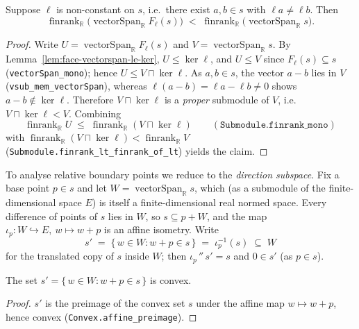 \begin{lemma}
    \label{lem:exposed-face-lower-dim}
    \leanok
    Suppose $\ell$ is non-constant on $s$, i.e.\ there exist $a, b \in s$ with
    $\ell a \ne \ell b$. Then
    \[
        \operatorname{finrank}_{\mathbb R}\big(\operatorname{vectorSpan}_{\mathbb R} F_\ell(s)\big)
        \;<\;
        \operatorname{finrank}_{\mathbb R}\big(\operatorname{vectorSpan}_{\mathbb R} s\big).
    \]
\end{lemma}
\begin{proof}
    Write $U = \operatorname{vectorSpan}_{\mathbb R} F_\ell(s)$ and
    $V = \operatorname{vectorSpan}_{\mathbb R} s$. By
    Lemma~\ref{lem:face-vectorspan-le-ker}, $U \le \ker \ell$, and $U \le V$ since
    $F_\ell(s) \subseteq s$ (\texttt{vectorSpan\_mono}); hence
    $U \le V \sqcap \ker \ell$. As $a, b \in s$, the vector $a - b$ lies in $V$
    (\texttt{vsub\_mem\_vectorSpan}), whereas $\ell(a - b) = \ell a - \ell b \ne 0$
    shows $a - b \notin \ker \ell$. Therefore $V \sqcap \ker \ell$ is a
    \emph{proper} submodule of $V$, i.e.\ $V \sqcap \ker \ell < V$. Combining
    \[
        \operatorname{finrank}_{\mathbb R} U
        \;\le\; \operatorname{finrank}_{\mathbb R}(V \sqcap \ker \ell)
        \qquad (\texttt{Submodule.finrank\_mono})
    \]
    with
    $\operatorname{finrank}_{\mathbb R}(V \sqcap \ker \ell) < \operatorname{finrank}_{\mathbb R} V$
    (\texttt{Submodule.finrank\_lt\_finrank\_of\_lt}) yields the claim.
\end{proof}

To analyse relative boundary points we reduce to the \emph{direction subspace}.
Fix a base point $p \in s$ and let $W = \operatorname{vectorSpan}_{\mathbb R} s$,
which (as a submodule of the finite-dimensional space $E$) is itself a
finite-dimensional real normed space. Every difference of points of $s$ lies in
$W$, so $s \subseteq p + W$, and the map
$\iota_p : W \hookrightarrow E,\ w \mapsto w + p$ is an affine isometry. Write
\[
    s' \;=\; \{\, w \in W : w + p \in s \,\} \;=\; \iota_p^{-1}(s) \;\subseteq\; W
\]
for the translated copy of $s$ inside $W$; then $\iota_p\,''\,s' = s$ and
$0 \in s'$ (as $p \in s$).

\begin{lemma}
    \label{lem:translated-set-convex}
    \leanok
    The set $s' = \{\, w \in W : w + p \in s \,\}$ is convex.
\end{lemma}
\begin{proof}
    $s'$ is the preimage of the convex set $s$ under the affine map
    $w \mapsto w + p$, hence convex (\texttt{Convex.affine\_preimage}).
\end{proof}

